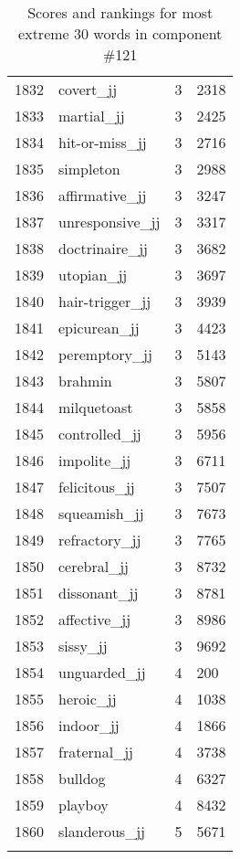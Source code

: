 \begin{longtable}[!htbp]{| rlr@{.}l |}
    1832 & covert\_jj & 3 & 2318 \\
    1833 & martial\_jj & 3 & 2425 \\
    1834 & hit-or-miss\_jj & 3 & 2716 \\
    1835 & simpleton & 3 & 2988 \\
    1836 & affirmative\_jj & 3 & 3247 \\
    1837 & unresponsive\_jj & 3 & 3317 \\
    1838 & doctrinaire\_jj & 3 & 3682 \\
    1839 & utopian\_jj & 3 & 3697 \\
    1840 & hair-trigger\_jj & 3 & 3939 \\
    1841 & epicurean\_jj & 3 & 4423 \\
    1842 & peremptory\_jj & 3 & 5143 \\
    1843 & brahmin & 3 & 5807 \\
    1844 & milquetoast & 3 & 5858 \\
    1845 & controlled\_jj & 3 & 5956 \\
    1846 & impolite\_jj & 3 & 6711 \\
    1847 & felicitous\_jj & 3 & 7507 \\
    1848 & squeamish\_jj & 3 & 7673 \\
    1849 & refractory\_jj & 3 & 7765 \\
    1850 & cerebral\_jj & 3 & 8732 \\
    1851 & dissonant\_jj & 3 & 8781 \\
    1852 & affective\_jj & 3 & 8986 \\
    1853 & sissy\_jj & 3 & 9692 \\
    1854 & unguarded\_jj & 4 & 200 \\
    1855 & heroic\_jj & 4 & 1038 \\
    1856 & indoor\_jj & 4 & 1866 \\
    1857 & fraternal\_jj & 4 & 3738 \\
    1858 & bulldog & 4 & 6327 \\
    1859 & playboy & 4 & 8432 \\
    1860 & slanderous\_jj & 5 & 5671 \\
    \hline
    \caption{Scores and rankings for most extreme 30 words in component \#121} \\
\end{longtable}
